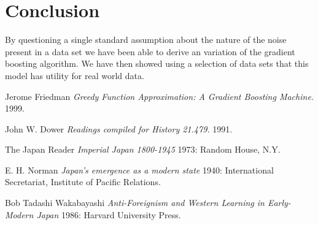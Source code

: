 \documentclass[11pt,twoside,a4paper]{article}
\begin{document}
\section{Conclusion}

By questioning a single standard assumption about the nature of the noise present in a data set
we have been able to derive an variation of the gradient boosting algorithm. We have then showed
using a selection of data sets that this model has utility for real world data.


  \begin{thebibliography}{1}

   Jerome Friedman {\em Greedy Function Approximation: A Gradient Boosting Machine.}  1999.

   John W. Dower {\em Readings compiled for History
  21.479.}  1991.

    The Japan Reader {\em Imperial Japan 1800-1945} 1973:
  Random House, N.Y.

   E. H. Norman {\em Japan's emergence as a modern
  state} 1940: International Secretariat, Institute of Pacific
  Relations.

   Bob Tadashi Wakabayashi {\em Anti-Foreignism and Western
  Learning in Early-Modern Japan} 1986: Harvard University Press.

  \end{thebibliography}
\end{document}
